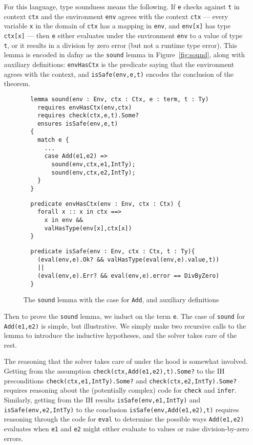 \documentclass[sigplan,review,screen,anonymous]{acmart}
\begin{document}
For this language, type soundness means the following. If \texttt{e} checks against \texttt{t} in context
\texttt{ctx} and the environment
\texttt{env} agrees with the context \texttt{ctx} --- every variable \texttt{x}
in the domain of \texttt{ctx} has a mapping in \texttt{env}, and \texttt{env[x]} has type \texttt{ctx[x]} ---
then \texttt{e} either evaluates under the environment \texttt{env} to a value of type \texttt{t}, or it results
in a division by zero error (but not a runtime type error). 
This lemma is encoded in dafny as the \texttt{sound} lemma in Figure~\ref{fig:sound},
along with auxiliary definitions: \texttt{envHasCtx} is the predicate saying that the environment agrees with the context,
and \texttt{isSafe(env,e,t)} encodes the conclusion of the theorem.

\begin{figure}
  \begin{verbatim}
  lemma sound(env : Env, ctx : Ctx, e : term, t : Ty)
    requires envHasCtx(env,ctx)
    requires check(ctx,e,t).Some?
    ensures isSafe(env,e,t)
  {
    match e {
      ...
      case Add(e1,e2) =>
        sound(env,ctx,e1,IntTy);
        sound(env,ctx,e2,IntTy);
    }
  }
  \end{verbatim}

  \begin{verbatim}
  predicate envHasCtx(env : Env, ctx : Ctx) {
    forall x :: x in ctx ==>
      x in env &&
      valHasType(env[x],ctx[x])
  }
  \end{verbatim}

  \begin{verbatim}
  predicate isSafe(env : Env, ctx : Ctx, t : Ty){
    (eval(env,e).Ok? && valHasType(eval(env,e).value,t))
    ||
    (eval(env,e).Err? && eval(env,e).error == DivByZero)
  }
  \end{verbatim}

  \caption{The \texttt{sound} lemma with the case for \texttt{Add}, and auxiliary definitions}
\end{figure}


Then to prove the \texttt{sound} lemma, we induct on the term \texttt{e}.
The case of \texttt{sound} for \texttt{Add(e1,e2)} is simple, but illustrative.
We simply make two recursive calls to the lemma to introduce the inductive hypotheses,
and the solver takes care of the rest. 

The reasoning that the solver takes care of under the hood is somewhat involved.
Getting from the assumption \texttt{check(ctx,Add(e1,e2),t).Some?} to
the IH preconditions \texttt{check(ctx,e1,IntTy).Some?} and
\texttt{check(ctx,e2,IntTy).Some?} requires reasoning about the (potentially complex) code for
\texttt{check} and \texttt{infer}. Similarly, getting from the IH results \texttt{isSafe(env,e1,IntTy)} and
\texttt{isSafe(env,e2,IntTy)} to the conclusion
\texttt{isSafe(env,Add(e1,e2),t)} requires reasoning through the code for \texttt{eval} to determine the possible
ways \texttt{Add(e1,e2)} evaluates when \texttt{e1} and \texttt{e2} might either evaluate to values or
raise division-by-zero errors.
\end{document}
